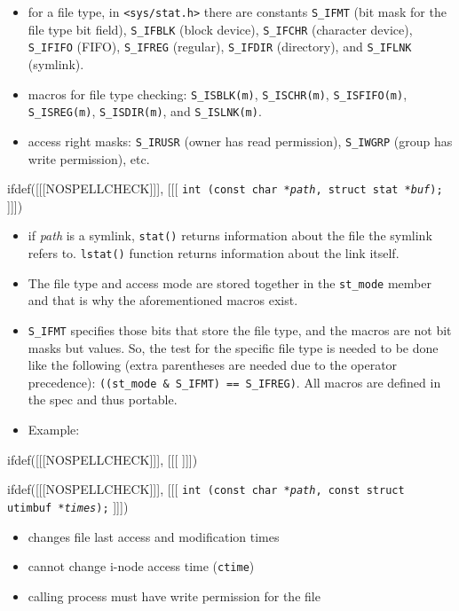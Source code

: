\begin{slide}
\begin{itemize}
\item for a file type, in \texttt{<sys/stat.h>} there are
constants \verb#S_IFMT# (bit mask for the file type bit field), \verb#S_IFBLK#
(block device), \verb#S_IFCHR# (character device), \verb#S_IFIFO#
(FIFO), \verb#S_IFREG# (regular), \verb#S_IFDIR# (directory), and
\verb#S_IFLNK# (symlink). 
\item macros for file type checking: \verb#S_ISBLK(m)#,
\verb#S_ISCHR(m)#, \verb#S_ISFIFO(m)#, \verb#S_ISREG(m)#,
\verb#S_ISDIR(m)#, and \verb#S_ISLNK(m)#. 
\item access right masks: \verb#S_IRUSR# (owner has read permission),
\verb#S_IWGRP# (group has write permission), etc.
\end{itemize}
ifdef([[[NOSPELLCHECK]]], [[[
\texttt{int (const char *\emph{path}, struct stat
*\emph{buf});}
]]])
\begin{itemize}
\item if \emph{path} is a symlink, \texttt{stat()} returns information about the
file the symlink refers to. \texttt{lstat()} function returns information about the link
itself.
\end{itemize}
\end{slide}

\begin{itemize}
\item The file type and access mode are stored together in the
\verb#st_mode# member and that is why the aforementioned macros exist.
\item \texttt{S\_IFMT} specifies those bits that store the file type, and the
macros are not bit masks but values.  So, the test for the specific file type is
needed to be done like the following (extra parentheses are needed due to the
operator precedence): \texttt{((st\_mode~\&~S\_IFMT)~==~S\_IFREG)}.  All macros
are defined in the spec and thus portable.
\item Example: 
\end{itemize}


ifdef([[[NOSPELLCHECK]]], [[[
]]])

\begin{slide}
ifdef([[[NOSPELLCHECK]]], [[[
\texttt{int (const char *\emph{path},
const struct utimbuf *\emph{times});}
]]])
\begin{itemize}
\item changes file last access and modification times
\item cannot change i-node access time (\texttt{ctime})
\item calling process must have write permission for the file
\end{itemize}
\end{slide}

